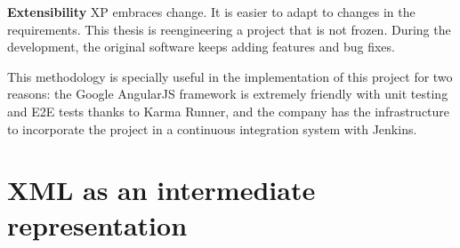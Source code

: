 \textbf{Extensibility} \ac{XP} embraces change. 
It is easier to adapt to changes in the requirements. 
This thesis is reengineering a project that is not frozen. 
During the development, the original software keeps adding features and bug fixes.

This methodology is specially useful in the implementation of this project for two reasons: 
the Google AngularJS framework is extremely friendly with unit testing and \ac{E2E} tests thanks to Karma Runner, and the company has the infrastructure to incorporate the project in a continuous integration system with Jenkins.

\section{XML as an intermediate representation}


